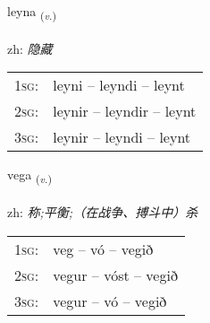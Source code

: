 \documentclass[frontgrid, backgrid]{flacards}\usepackage[]{graphicx}\usepackage[]{color}
\begin{document}
\renewcommand{\blhead}{\vskip5pt {\small\bfseries\footnotesize Sagnorð | 动词 }}
\renewcommand{\bcfoot}{\vskip5pt \hspace{2pt}{\small\bfseries\footnotesize 2K}}


{leyna \small{\textsubscript{(\textit{v.})}} \\[1ex] %
\textphonetic{[leiːna]} \\
zh: \emph{隐藏} \\  [2ex]
\renewcommand*{\arraystretch}{0.8}
\begin{tabular}{p{1cm}l}
\textsc{1sg}: & leyni -- leyndi -- leynt \\ 
\textsc{2sg}: & leynir -- leyndir -- leynt \\ 
\textsc{3sg}: & leynir -- leyndi -- leynt \\ 
\end{tabular}
}

\renewcommand{\flhead}{\vskip5pt \fboxsep=0pt {\small\bfseries\footnotesize Sagnorð | 动词}}
\renewcommand{\fcfoot}{\vskip5pt \fboxsep=0pt \hspace{2pt}{\small\bfseries\footnotesize 2K}}

\renewcommand{\blhead}{\vskip5pt {\small\bfseries\footnotesize Sagnorð | 动词 }}
\renewcommand{\bcfoot}{\vskip5pt \hspace{2pt}{\small\bfseries\footnotesize 2K}}


{vega \small{\textsubscript{(\textit{v.})}} \\[1ex] %
\textphonetic{[vɛːɣa]} \\
zh: \emph{称;平衡;（在战争、搏斗中）杀} \\  [2ex]
\renewcommand*{\arraystretch}{0.8}
\begin{tabular}{p{1cm}l}
\textsc{1sg}: & veg -- vó -- vegið \\ 
\textsc{2sg}: & vegur -- vóst -- vegið \\ 
\textsc{3sg}: & vegur -- vó -- vegið \\ 
\end{tabular}
}
\end{document}
